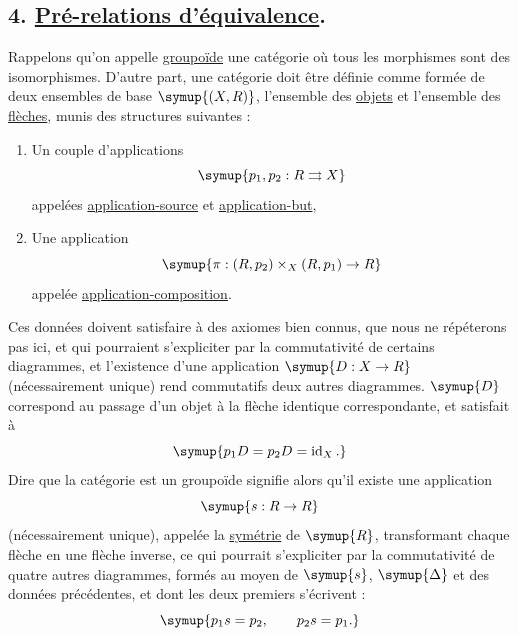 \subsection*{\textnormal{4. \uline{Pré-relations d'équivalence}.}}

Rappelons qu'on appelle \uline{groupoïde} une catégorie où tous les morphismes
sont des isomorphismes. D'autre part, une catégorie doit être définie comme
formée de deux ensembles de base $\symup{(X,R)}$, l'ensemble des \uline{objets} et
l'ensemble des \uline{flèches}, munis des structures suivantes :
\begin{enumerate}
\item[(i)] Un couple d'applications
\[
  \symup{p_1,p_2:R\rightrightarrows X}
\]
appelées \uline{application-source} et \uline{application-but},

\item[(ii)] Une application
\[
  \symup{\pi:(R,p_2)\times_X(R,p_1)\to R}
\]
appelée \uline{application-composition}.
\end{enumerate}
Ces données doivent satisfaire à des axiomes bien connus, que nous ne
répéterons pas ici, et qui pourraient s'expliciter par la commutativité de
certains diagrammes, et l'existence d'une application $\symup{D:X\to R}$
(nécessairement unique) rend commutatifs deux autres diagrammes. $\symup{D}$
correspond au passage d'un objet à la flèche identique correspondante, et
satisfait à
\[
  \symup{p_1D=p_2D=\operatorname{id}_X.}
\]
Dire que la catégorie est un groupoïde signifie alors qu'il existe une
application
\[
  \symup{s:R\to R}
\]
(nécessairement unique), appelée la \uline{symétrie} de $\symup{R}$, transformant
chaque flèche en une flèche inverse, ce qui pourrait s'expliciter par la
commutativité de quatre autres diagrammes, formés au moyen de $\symup{s}$, $\symup{\Delta}$
et des données précédentes, et dont les deux premiers s'écrivent :
\[
  \symup{p_1s=p_2,\qquad p_2s=p_1.}
\]


